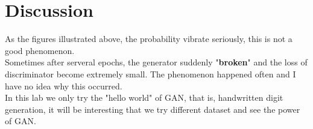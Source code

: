\documentclass[12pt,a4paper]{article}
\begin{document}
\section{Discussion} \label{sec:dis}
As the figures illustrated above, the probability vibrate seriously, this is not a good phenomenon. \\
Sometimes after serveral epochs, the generator suddenly "\textbf{broken}" and the loss of discriminator become extremely small. The phenomenon happened often and I have no idea why this occurred. \\
In this lab we only try the "hello world" of GAN, that is, handwritten digit generation, it will be interesting that we try different dataset and see the power of GAN.

%
%
\end{document}

